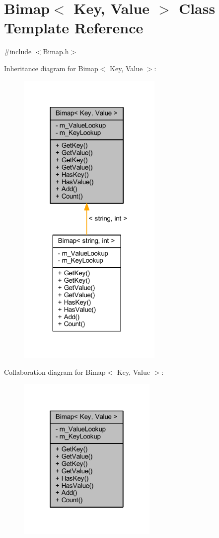 \hypertarget{class_bimap}{}\section{Bimap$<$ Key, Value $>$ Class Template Reference}
\label{class_bimap}


{\ttfamily \#include $<$Bimap.\+h$>$}



Inheritance diagram for Bimap$<$ Key, Value $>$\+:\nopagebreak
\begin{figure}[H]
\begin{center}
\leavevmode
\includegraphics[width=197pt]{class_bimap__inherit__graph}
\end{center}
\end{figure}


Collaboration diagram for Bimap$<$ Key, Value $>$\+:\nopagebreak
\begin{figure}[H]
\begin{center}
\leavevmode
\includegraphics[width=190pt]{class_bimap__coll__graph}
\end{center}
\end{figure}
